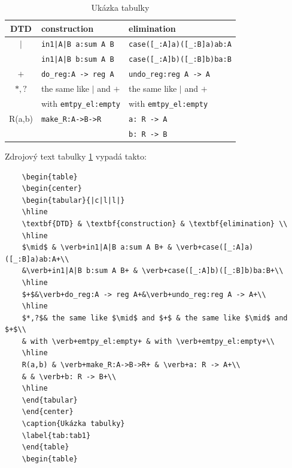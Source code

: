 \documentclass[11pt,oneside,a4paper]{book}
\begin{document}
	\begin{table}
		\begin{center}
			\begin{tabular}{|c|l|l|}
				\hline
				\textbf{DTD} & \textbf{construction} & \textbf{elimination} \\
				\hline
				$\mid$ & \verb+in1|A|B a:sum A B+ & \verb+case([_:A]a)([_:B]a)ab:A+\\
				&\verb+in1|A|B b:sum A B+ & \verb+case([_:A]b)([_:B]b)ba:B+\\
				\hline
				$+$&\verb+do_reg:A -> reg A+&\verb+undo_reg:reg A -> A+\\
				\hline
				$*,?$& the same like $\mid$ and $+$ & the same like $\mid$ and $+$\\
				& with \verb+emtpy_el:empty+ & with \verb+emtpy_el:empty+\\
				\hline
				R(a,b) & \verb+make_R:A->B->R+ & \verb+a: R -> A+\\
				& & \verb+b: R -> B+\\
				\hline
			\end{tabular}
		\end{center}
		\caption{Ukázka tabulky}
		\label{tab:tab1}
	\end{table}
	
	Zdrojový text tabulky \ref{tab:tab1} vypadá takto:
	\begin{verbatim}
	\begin{table}
	\begin{center}
	\begin{tabular}{|c|l|l|}
	\hline
	\textbf{DTD} & \textbf{construction} & \textbf{elimination} \\
	\hline
	$\mid$ & \verb+in1|A|B a:sum A B+ & \verb+case([_:A]a)([_:B]a)ab:A+\\
	&\verb+in1|A|B b:sum A B+ & \verb+case([_:A]b)([_:B]b)ba:B+\\
	\hline
	$+$&\verb+do_reg:A -> reg A+&\verb+undo_reg:reg A -> A+\\
	\hline
	$*,?$& the same like $\mid$ and $+$ & the same like $\mid$ and $+$\\
	& with \verb+emtpy_el:empty+ & with \verb+emtpy_el:empty+\\
	\hline
	R(a,b) & \verb+make_R:A->B->R+ & \verb+a: R -> A+\\
	& & \verb+b: R -> B+\\
	\hline
	\end{tabular}
	\end{center}
	\caption{Ukázka tabulky}
	\label{tab:tab1}
	\end{table}
	\begin{table}
	\end{verbatim}
	
\end{document}

